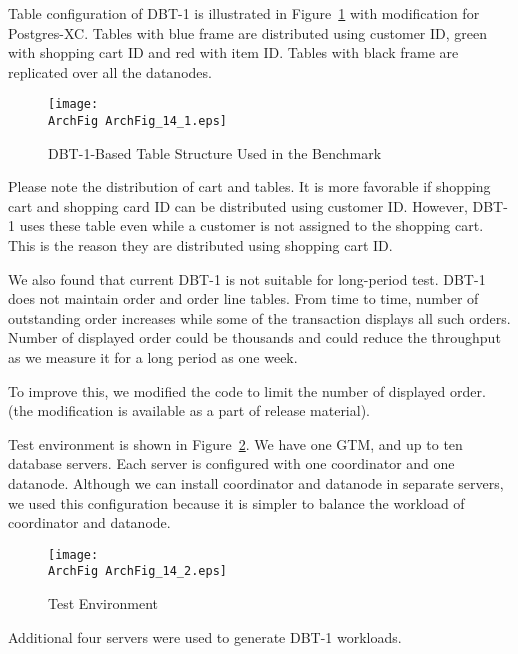   Table configuration of DBT-1 is illustrated in Figure~\ref{archfig:15} with
  modification for Postgres-XC.
  Tables with blue frame are distributed using customer ID, green with shopping
  cart ID and red with item ID.
  Tables with black frame are replicated over all the datanodes.
  
  \begin{figure}[htp]
	  \begin{center}
		  \texttt{[image: \\ArchFig ArchFig\_14\_1.eps]}
		  \caption{\label{archfig:15}DBT-1-Based Table Structure Used in the Benchmark}
	  \end{center}
  \end{figure}
  
  Please note the distribution of  cart and  tables.
  It is more favorable if shopping cart and shopping card ID can be distributed using
  customer ID.
  However, DBT-1 uses these table even while a customer is not assigned to the shopping cart.
  This is the reason they are distributed using shopping cart ID.
  
  We also found that current DBT-1 is not suitable for long-period test.
  DBT-1 does not maintain order and order line tables.
  From time to time, number of outstanding order increases while some of the
  transaction displays all such orders.
  Number of displayed order could be thousands and could reduce the throughput as we measure it
  for a long period as one week.
  
  To improve this, we modified the code to limit the number of displayed order.
  (the modification is available as a part of \XC{} release material).
  
  Test environment is shown in Figure~\ref{archfig:16}.
  We have one GTM, and up to ten database servers.
  Each server is configured with one coordinator and one datanode.
  Although we can install coordinator and datanode in separate servers, we used this
  configuration because it is simpler to balance the workload of coordinator and datanode.
  
  \begin{figure}[htp]
	  \begin{center}
		  \texttt{[image: \\ArchFig ArchFig\_14\_2.eps]}
		  \caption{\label{archfig:16}\XC{} Test Environment}
	  \end{center}
  \end{figure}
  
  Additional four servers were used to generate DBT-1 workloads.
  
